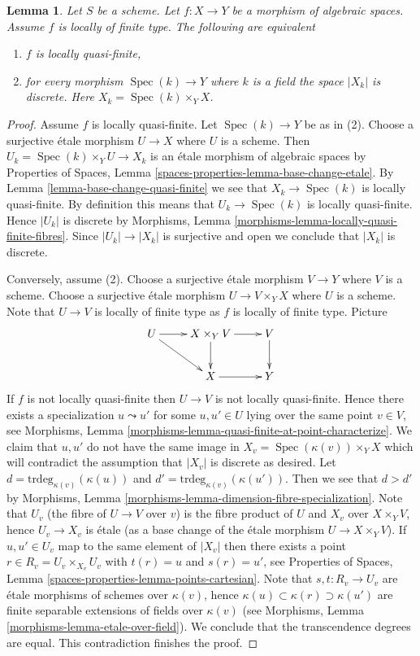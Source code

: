 \documentclass[10pt,a4paper]{amsart}
\theoremstyle{plain}
\newtheorem{lemma}[subsection]{Lemma}
\theoremstyle{definition}
\theoremstyle{remark}
\numberwithin{equation}{subsection}
\def\Spec{\mathop{\mathrm{Spec}}}
\begin{document}
\begin{lemma}
\label{lemma-locally-quasi-finite}
Let $S$ be a scheme. Let $f : X \to Y$ be a morphism of algebraic spaces.
Assume $f$ is locally of finite type. The following are equivalent
\begin{enumerate}
\item $f$ is locally quasi-finite,
\item for every morphism $\Spec(k) \to Y$ where $k$ is a field
the space $|X_k|$ is discrete. Here $X_k = \Spec(k) \times_Y X$.
\end{enumerate}
\end{lemma}

\begin{proof}
Assume $f$ is locally quasi-finite. Let $\Spec(k) \to Y$ be as
in (2). Choose a surjective \'etale morphism $U \to X$ where $U$ is a scheme.
Then $U_k = \Spec(k) \times_Y U \to X_k$ is an
\'etale morphism of algebraic spaces by
Properties of Spaces, Lemma \ref{spaces-properties-lemma-base-change-etale}.
By
Lemma \ref{lemma-base-change-quasi-finite}
we see that $X_k \to \Spec(k)$ is locally quasi-finite. By
definition this means that $U_k \to \Spec(k)$ is locally
quasi-finite. Hence $|U_k|$ is discrete by
Morphisms, Lemma \ref{morphisms-lemma-locally-quasi-finite-fibres}.
Since $|U_k| \to |X_k|$ is surjective and open we conclude that $|X_k|$
is discrete.

\medskip\noindent
Conversely, assume (2). Choose a surjective \'etale morphism $V \to Y$
where $V$ is a scheme. Choose a surjective \'etale morphism
$U \to V \times_Y X$ where $U$ is a scheme.
Note that $U \to V$ is locally of finite type as $f$ is locally of finite type.
Picture
$$
\xymatrix{
U \ar[r] \ar[rd] & X \times_Y V \ar[d] \ar[r] & V \ar[d] \\
& X \ar[r] & Y
}
$$
If $f$ is not locally quasi-finite then $U \to V$ is not locally quasi-finite.
Hence there exists a specialization $u \leadsto u'$ for some $u, u' \in U$
lying over the same point $v \in V$, see
Morphisms, Lemma \ref{morphisms-lemma-quasi-finite-at-point-characterize}.
We claim that $u, u'$ do not have the same image in
$X_v = \Spec(\kappa(v)) \times_Y X$
which will contradict the assumption that $|X_v|$ is discrete as desired.
Let $d = \text{trdeg}_{\kappa(v)}(\kappa(u))$ and
$d' = \text{trdeg}_{\kappa(v)}(\kappa(u'))$.
Then we see that $d > d'$ by
Morphisms, Lemma \ref{morphisms-lemma-dimension-fibre-specialization}.
Note that $U_v$ (the fibre of $U \to V$ over $v$) is the fibre product of
$U$ and $X_v$ over $X \times_Y V$, hence $U_v \to X_v$ is \'etale (as a
base change of the \'etale morphism $U \to X \times_Y V$). If
$u, u' \in U_v$ map to the same element of $|X_v|$ then there exists a point
$r \in R_v = U_v \times_{X_v} U_v$ with $t(r) = u$ and $s(r) = u'$, see
Properties of Spaces, Lemma \ref{spaces-properties-lemma-points-cartesian}.
Note that $s, t : R_v \to U_v$ are \'etale morphisms of schemes
over $\kappa(v)$, hence $\kappa(u) \subset \kappa(r) \supset \kappa(u')$
are finite separable extensions of fields over $\kappa(v)$ (see
Morphisms, Lemma \ref{morphisms-lemma-etale-over-field}).
We conclude that the transcendence degrees are equal.
This contradiction finishes the proof.
\end{proof}
\end{document}
